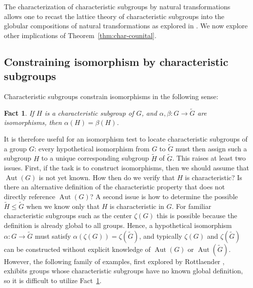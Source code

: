 \documentclass{amsart}
\numberwithin{lstfloat}{section}
\DeclareMathOperator{\Aut}{Aut}
\renewcommand{\leq}{\leqslant}
\renewcommand{\leq}{\leqslant}
\newtheorem{fact}[thm]{Fact}
\theoremstyle{definition}
\theoremstyle{remark}
\numberwithin{equation}{section}
\begin{document}
The characterization of characteristic subgroups by natural
transformations allows one to recast the lattice theory of characteristic
subgroups into the globular compositions of natural transformations as
explored in \cites{Baez, Power}. 
We now explore 
other implications 
of Theorem~\ref{thm:char-counital}.



\subsection{Constraining isomorphism by characteristic subgroups}
\label{sec:intro-iso}
Characteristic subgroups 
constrain isomorphisms in the following sense:
\begin{fact}\label{fact:aut-iso}
  If $H$ is a characteristic subgroup of $G$, 
and $\alpha,\beta:G\to \tilde{G}$ are isomorphisms, 
  then $\alpha(H)=\beta(H)$.
\end{fact}

It is therefore useful for an isomorphism test to locate characteristic
subgroups of a group $G$: every hypothetical isomorphism from $G$ to $\tilde{G}$
must then assign such a subgroup $H$ to a unique corresponding subgroup
$\tilde{H}$ of $\tilde{G}$.  This raises at least two issues. First, if the task is
to construct isomorphisms, then we should assume that $\Aut(G)$ is not yet
known. How then do we verify that $H$ is characteristic? Is there an alternative
definition of the characteristic property that does not directly reference
$\Aut(G)$? A second issue is how to determine the possible $\tilde{H}\leq
\tilde{G}$ when we know only that $H$ is characteristic in $G$. For familiar
characteristic subgroups such as the center $\zeta(G)$ this is possible because
the definition is already global to all groups. Hence, 
a hypothetical isomorphism $\alpha:G\to \tilde{G}$ must satisfy
$\alpha(\zeta(G))=\zeta(\tilde{G})$, and typically $\zeta(G)$ and
$\zeta(\tilde{G})$ can be constructed without explicit knowledge of $\Aut(G)$ or
$\Aut(\tilde{G})$. However, the following family of examples, first explored by
Rottlaender \cite{Rottlander28}, exhibits groups whose characteristic subgroups
have no known global definition, so it is difficult to utilize
Fact~\ref{fact:aut-iso}.
\end{document}
